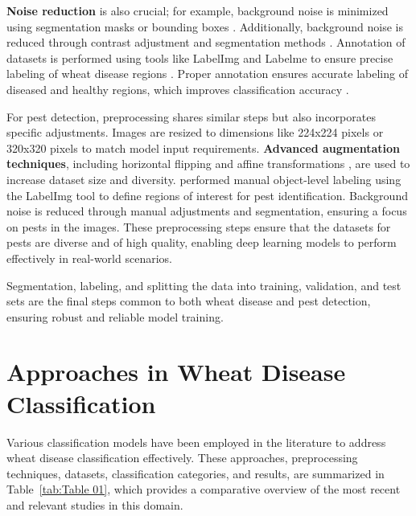 \textbf{Noise reduction} is also crucial; for example, background noise is minimized using segmentation masks or bounding boxes \parencite{hassan2024wheat}. Additionally, background noise is reduced through contrast adjustment and segmentation methods \parencite{fang2023lightweight}. Annotation of datasets is performed using tools like LabelImg and Labelme to ensure precise labeling of wheat disease regions \parencite{yao2024yolo} \parencite{hassan2024wheat}. Proper annotation ensures accurate labeling of diseased and healthy regions, which improves classification accuracy \parencite{goyal2021leaf}.

For pest detection, preprocessing shares similar steps but also incorporates specific adjustments. Images are resized to dimensions like 224x224 pixels \parencite{turkoglu2019plant} \parencite{albattah2023custom} or 320x320 pixels \parencite{ali2023faster} to match model input requirements. \textbf{Advanced augmentation techniques}, including horizontal flipping \parencite{liu2019pestnet} and affine transformations \parencite{ali2023faster}, are used to increase dataset size and diversity. \parencite{albattah2023custom} performed manual object-level labeling using the LabelImg tool to define regions of interest for pest identification. Background noise is reduced through manual adjustments and segmentation, ensuring a focus on pests in the images. These preprocessing steps ensure that the datasets for pests are diverse and of high quality, enabling deep learning models to perform effectively in real-world scenarios.

Segmentation, labeling, and splitting the data into training, validation, and test sets are the final steps common to both wheat disease and pest detection, ensuring robust and reliable model training.

\section{Approaches in Wheat Disease Classification}

Various classification models have been employed in the literature to address wheat disease classification effectively. These approaches, preprocessing techniques, datasets, classification categories, and results, are summarized in Table~\ref{tab:Table 01}, which provides a comparative overview of the most recent and relevant studies in this domain.

